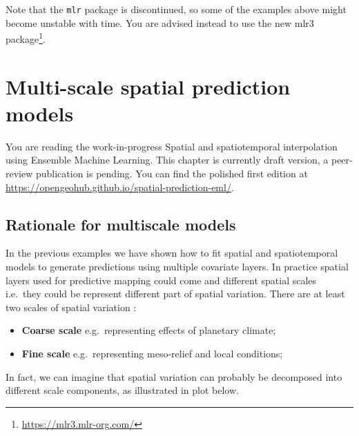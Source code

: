 \documentclass[
  graybox,natbib,nospthms]{svmono}
\providecommand{\tightlist}{%
  \setlength{\itemsep}{0pt}\setlength{\parskip}{0pt}}
\providecommand{\tightlist}{\setlength{\itemsep}{0pt}\setlength{\parskip}{0pt}}
\renewcommand{\href}[2]{#2 (\url{#1})}
\renewcommand{\href}[2]{#2\footnote{\url{#1}}}
\begin{document}
Note that the \texttt{mlr} package is discontinued, so some of the examples
above might become unstable with time. You are advised instead to use
the new \href{https://mlr3.mlr-org.com/}{mlr3 package}.

\hypertarget{multi-scale-spatial-prediction-models}{%
\chapter{Multi-scale spatial prediction models}\label{multi-scale-spatial-prediction-models}}

You are reading the work-in-progress Spatial and spatiotemporal interpolation using Ensemble Machine Learning. This chapter is currently draft version, a peer-review publication is pending. You can find the polished first edition at \url{https://opengeohub.github.io/spatial-prediction-eml/}.

\hypertarget{rationale-for-multiscale-models}{%
\section{Rationale for multiscale models}\label{rationale-for-multiscale-models}}

In the previous examples we have shown how to fit spatial and spatiotemporal models
to generate predictions using multiple covariate layers. In practice spatial layers
used for predictive mapping could come and different spatial scales i.e.~they could
be represent different part of spatial variation. There are at least two scales of
spatial variation \citep{hengl2021african}:

\begin{itemize}
\tightlist
\item
  \textbf{Coarse scale} e.g.~representing effects of planetary climate;
\item
  \textbf{Fine scale} e.g.~representing meso-relief and local conditions;
\end{itemize}

In fact, we can imagine that spatial variation can probably be decomposed into different
scale components, as illustrated in plot below.
\end{document}
